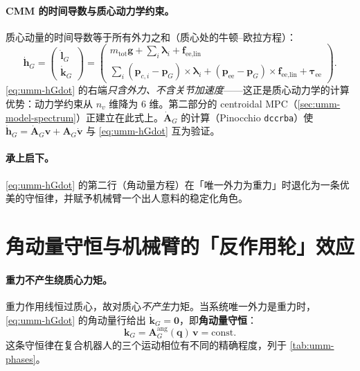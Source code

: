 \paragraph{CMM 的时间导数与质心动力学约束。}
质心动量的时间导数等于所有外力之和（质心处的牛顿--欧拉方程）：
\begin{equation}
  \dot{\mathbf h}_G=\begin{pmatrix}\dot{\mathbf l}_G\\ \dot{\mathbf k}_G\end{pmatrix}
  =\begin{pmatrix}
  m_{\text{tot}}\mathbf g+\sum_i\boldsymbol\lambda_i+\mathbf f_{\text{ee,lin}}\\[2pt]
  \sum_i(\mathbf p_{c,i}-\mathbf p_G)\times\boldsymbol\lambda_i+(\mathbf p_{\text{ee}}-\mathbf p_G)\times\mathbf f_{\text{ee,lin}}+\boldsymbol\tau_{\text{ee}}
  \end{pmatrix}.
  \label{eq:umm-hGdot}
\end{equation}
\cref{eq:umm-hGdot} 的右端\emph{只含外力、不含关节加速度}——这正是质心动力学的计算优势：动力学约束从 $n_v$ 维降为 $6$ 维。第二部分的 centroidal MPC（\cref{sec:umm-model-spectrum}）正建立在此式上。$\dot{\mathbf A}_G$ 的计算（Pinocchio \texttt{dccrba}）使 $\dot{\mathbf h}_G=\dot{\mathbf A}_G\mathbf v+\mathbf A_G\dot{\mathbf v}$ 与 \cref{eq:umm-hGdot} 互为验证。

\paragraph{承上启下。}
\cref{eq:umm-hGdot} 的第二行（角动量方程）在「唯一外力为重力」时退化为一条优美的守恒律，并赋予机械臂一个出人意料的稳定化角色。

\section{角动量守恒与机械臂的「反作用轮」效应}
\label{sec:umm-momentum}

\paragraph{重力不产生绕质心力矩。}
重力作用线恒过质心，故对质心\emph{不产生}力矩。当系统唯一外力是重力时，\cref{eq:umm-hGdot} 的角动量行给出 $\dot{\mathbf k}_G=\mathbf 0$，即\textbf{角动量守恒}：
\begin{equation}
  \mathbf k_G=\mathbf A_G^{\text{ang}}(\mathbf q)\,\mathbf v=\text{const}.
  \label{eq:umm-kG-cons}
\end{equation}
这条守恒律在复合机器人的三个运动相位有不同的精确程度，列于 \cref{tab:umm-phases}。

